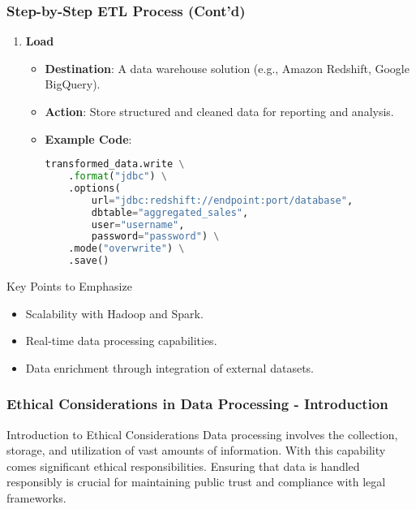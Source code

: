 \documentclass[aspectratio=169]{beamer}
\begin{document}
\begin{frame}[fragile]
    \frametitle{Step-by-Step ETL Process (Cont'd)}
    \begin{enumerate}[resume]
        \item \textbf{Load}
        \begin{itemize}
            \item \textbf{Destination}: A data warehouse solution (e.g., Amazon Redshift, Google BigQuery).
            \item \textbf{Action}: Store structured and cleaned data for reporting and analysis.
            \item \textbf{Example Code}:
            \begin{lstlisting}[language=Python]
transformed_data.write \
    .format("jdbc") \
    .options(
        url="jdbc:redshift://endpoint:port/database",
        dbtable="aggregated_sales",
        user="username",
        password="password") \
    .mode("overwrite") \
    .save()
            \end{lstlisting}
        \end{itemize}
    \end{enumerate}
    \begin{block}{Key Points to Emphasize}
        \begin{itemize}
            \item Scalability with Hadoop and Spark.
            \item Real-time data processing capabilities.
            \item Data enrichment through integration of external datasets.
        \end{itemize}
    \end{block}
\end{frame}

\begin{frame}[fragile]
    \frametitle{Ethical Considerations in Data Processing - Introduction}
    \begin{block}{Introduction to Ethical Considerations}
        Data processing involves the collection, storage, and utilization of vast amounts of information. 
        With this capability comes significant ethical responsibilities. Ensuring that data is handled responsibly 
        is crucial for maintaining public trust and compliance with legal frameworks.
    \end{block}
\end{frame}
\end{document}
